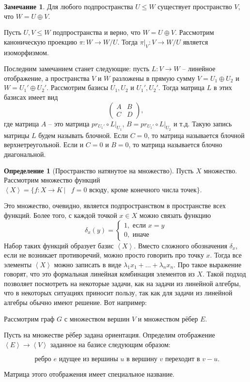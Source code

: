 \documentclass[10pt,a4paper,oneside]{book}
\theoremstyle{definition}
\newtheorem*{rem}{Замечание}
\newtheorem*{defn}{Определение}
\def\lan{\left\langle }
\def\ran{\right\rangle}
\def\dfn{\begin{defn}}
\def\edfn{\end{defn}}
\def\rm{\begin{rem}}
\def\erm{\end{rem}}
\def\pmat{\begin{pmatrix}}
\def\epmat{\end{pmatrix}}
\begin{document}
\rm Для любого подпространства $U \leq W$ существует пространство $V$, что $W=U\oplus V$.

  Пусть $U,V\leq W$ подпространства и верно, что $W=U\oplus V$. Рассмотрим каноническую проекцию $\pi \colon W \to W/U$. Тогда $\pi|_{V} \colon V \to W/U$ является изоморфизмом.
\erm

Последним замечанием станет следующие: пусть $L\colon V \to W$ -- линейное отображение, а пространства $V$ и $W$ разложены в прямую сумму $V=U_1\oplus U_2 $ и $W=U_1'\oplus U_2'$. Рассмотрим базисы  $U_1, U_2$ и $U_1', U_2'$. Тогда матрица $L$ в этих базисах имеет вид
$$ \pmat A& B \\
C & D
\epmat,
$$
где матрица $A$ -- это матрица $pr_{U_1'}\circ L|_{U_1}$, $B=pr_{U_1'}\circ L |_{U_2}$ и т.д. Такую запись матрицы $L$ будем называть блочной. Если $C=0$, то матрица называется блочной верхнетреугольной. Если и $C=0$ и $B=0$, то матрица называется блочно диагональной.


\dfn[Пространство натянутое на множество]
Пусть $X$ множество. Рассмотрим множество функций $\lan X \ran = \{ f\colon X \to K\,|\, \text{ $f=0$ всюду, кроме конечного числа точек} \}$.
\edfn

Это множество, очевидно, является подпространством в пространстве всех функций. Более того, с каждой точкой $x\in X$ можно связать функцию $$\delta_x(y)=\begin{cases} 1, \text{ если  $x=y$} \\
0, \text{ иначе }
\end{cases}$$
Набор таких функций образует базис $\lan X \ran$. Вместо сложного обозначения $\delta_x$, если не возникает противоречий, можно просто говорить про точку $x$. Тогда все элементы $\lan X \ran $ можно записать в виде $\lambda_1 x_1+\dots +\lambda_n x_n$. Про такое выражение говорят, что это формальная линейная комбинация элементов из $X$. Такой подход позволяет посмотреть на некоторые задачи, как на задачи из линейной алгебры, что в некоторых ситуациях приносит пользу, так как для задачи из линейной алгебры обычно имеют решение. Вот например:

Рассмотрим граф $G$ с множеством вершин $V$ и множеством рёбер $E$.

Пусть на множестве рёбер задана ориентация. Определим отображение $\lan E \ran \to \lan V \ran$ заданное на базисе следующим образом:

$$\text{ ребро $e$ идущее из вершины $u$ в вершину $v$ переходит в $v-u$}.$$

Матрица этого отображения имеет специальное название.
\end{document}
